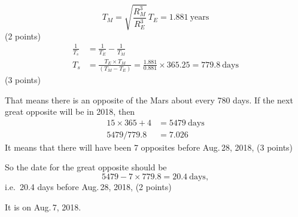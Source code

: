 \[
T_M = \sqrt{\frac{R_M^3}{R_E^3}}\,T_E = 1.881\ \mathrm{years}
\]
\hfill(2 points)
\begin{align*}
\frac{1}{T_s} &= \frac{1}{T_E} - \frac{1}{T_M}\\
T_s &= \frac{T_E \times T_M}{(T_M - T_E)}
     = \frac{1.881}{0.881}\times 365.25 = 779.8\ \mathrm{days}
\end{align*}
\hfill(3 points)

That means there is an opposite of the Mars about every 780 days. If the next
great opposite will be in 2018, then
\begin{align*}
15\times 365 + 4 &= 5479\ \mathrm{days}\\
5479/779.8 &= 7.026
\end{align*}
It means that there will have been 7 opposites before Aug.\,28, 2018,
\hfill(3 points)

So the date for the great opposite should be
\[
5479 - 7\times 779.8 = 20.4\ \mathrm{days},
\]
i.e.\ 20.4 days before Aug.\,28, 2018, \hfill(2 points)

It is on Aug.\,7, 2018.
